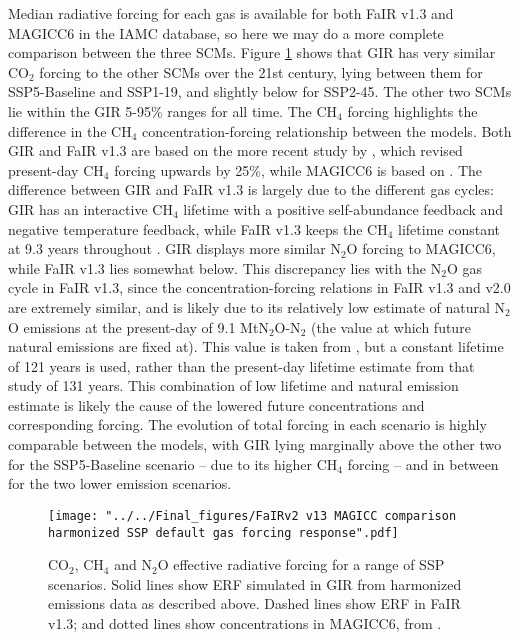 \documentclass[gmd, manuscript]{copernicus}
\begin{document}
Median radiative forcing for each gas is available for both FaIR v1.3 and MAGICC6 in the IAMC database, so here we may do a more complete comparison between the three SCMs. Figure \ref{fig:SSPforcs} shows that GIR has very similar CO$_2$ forcing to the other SCMs over the 21st century, lying between them for SSP5-Baseline and SSP1-19, and slightly below for SSP2-45. The other two SCMs lie within the GIR 5-95\% ranges for all time. The CH$_4$ forcing highlights the difference in the CH$_4$ concentration-forcing relationship between the models. Both GIR and FaIR v1.3 are based on the more recent study by \cite{Etminan2016}, which revised present-day CH$_4$ forcing upwards by 25\%, while MAGICC6 is based on \cite{Myhre2013a}. The difference between GIR and FaIR v1.3 is largely due to the different gas cycles: GIR has an interactive CH$_4$ lifetime with a positive self-abundance feedback and negative temperature feedback, while FaIR v1.3 keeps the CH$_4$ lifetime constant at 9.3 years throughout \citep{Smith2017}. GIR displays more similar N$_2$O forcing to MAGICC6, while FaIR v1.3 lies somewhat below. This discrepancy lies with the N$_2$O gas cycle in FaIR v1.3, since the concentration-forcing relations in FaIR v1.3 and v2.0 are extremely similar, and is likely due to its relatively low estimate of natural N$_2$O emissions at the present-day of 9.1 MtN$_2$O-N$_2$ (the value at which future natural emissions are fixed at). This value is taken from \cite{Prather2012}, but a constant lifetime of 121 years is used, rather than the present-day lifetime estimate from that study of 131 years. This combination of low lifetime and natural emission estimate is likely the cause of the lowered future concentrations and corresponding forcing. The evolution of total forcing in each scenario is highly comparable between the models, with GIR lying marginally above the other two for the SSP5-Baseline scenario -- due to its higher CH$_4$ forcing -- and in between for the two lower emission scenarios.\\
\begin{figure}[t]
    \texttt{[image: "../../Final\_figures/FaIRv2 v13 MAGICC comparison harmonized SSP default gas forcing response".pdf]}
    \caption{CO$_2$, CH$_4$ and N$_2$O effective radiative forcing for a range of SSP scenarios. Solid lines show ERF simulated in GIR from harmonized emissions data as described above. Dashed lines show ERF in FaIR v1.3; and dotted lines show concentrations in MAGICC6, from \cite{Huppmann:2018:scenario-data}.}
    \label{fig:SSPforcs}
\end{figure}
\end{document}
